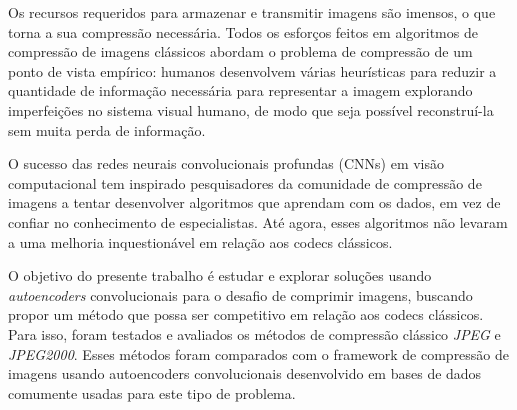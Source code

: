 Os recursos requeridos para armazenar e transmitir imagens são imensos, o que torna a sua compressão necessária. Todos os esforços feitos em algoritmos de compressão de imagens clássicos abordam o problema de compressão de um ponto de vista empírico: humanos desenvolvem várias heurísticas para reduzir a quantidade de informação necessária para representar a imagem explorando imperfeições no sistema visual humano, de modo que seja possível reconstruí-la sem muita perda de informação. 

O sucesso das redes neurais convolucionais profundas (CNNs) em visão computacional tem inspirado pesquisadores da comunidade de compressão de imagens a tentar desenvolver algoritmos que aprendam com os dados, em vez de confiar no conhecimento de especialistas. Até agora, esses algoritmos não levaram a uma melhoria inquestionável em relação aos codecs clássicos.

O objetivo do presente trabalho é estudar e explorar soluções usando \textit{autoencoders} convolucionais para o desafio de comprimir imagens, buscando propor um método que possa ser competitivo em relação aos codecs clássicos. Para isso, foram testados e avaliados os métodos de compressão clássico \textit{JPEG} e \textit{JPEG2000}. Esses métodos foram comparados com o framework de compressão de imagens usando autoencoders convolucionais desenvolvido em bases de dados comumente usadas para este tipo de problema. 


